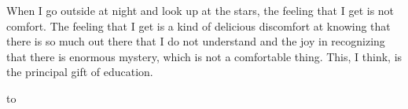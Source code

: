 \documentclass[14pt,fleqn,leqno]{beamer}
\begin{document}
\begin{frame}[plain]

When I go outside at night and look up at the stars, the feeling that I get is not comfort. The feeling that I get is a kind of delicious discomfort at knowing that there is so much out there that I do not understand and the joy in recognizing that there is enormous mystery, which is not a comfortable thing. This, I think, is the principal gift of education.

\smallskip
\hbox to

\end{frame}
\end{document}
